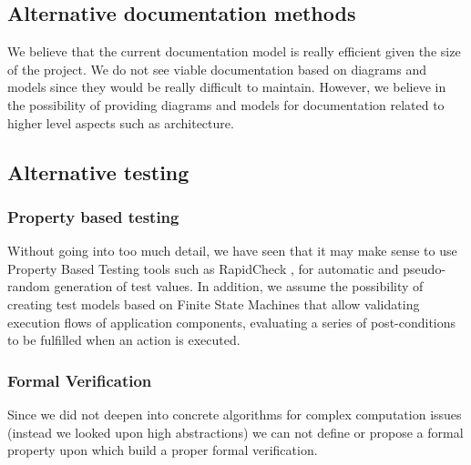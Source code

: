 \subsection{Alternative documentation methods}

We believe that the current documentation model is really efficient given the size of the project. We do not see viable documentation based on diagrams and models since they would be really difficult to maintain. However, we believe in the possibility of providing diagrams and models for documentation related to higher level aspects such as architecture.

\subsection{Alternative testing}

\subsubsection{Property based testing}
Without going into too much detail, we have seen that it may make sense to use Property Based Testing tools such as RapidCheck \cite{rapidcheck}, for automatic and pseudo-random generation of test values. In addition, we assume the possibility of creating test models based on Finite State Machines that allow validating execution flows of application components, evaluating a series of post-conditions to be fulfilled when an action is executed.

\subsubsection{Formal Verification}
Since we did not deepen into concrete algorithms for complex computation issues (instead we looked upon high abstractions) we can not define or propose a formal property upon which build a proper formal verification.
